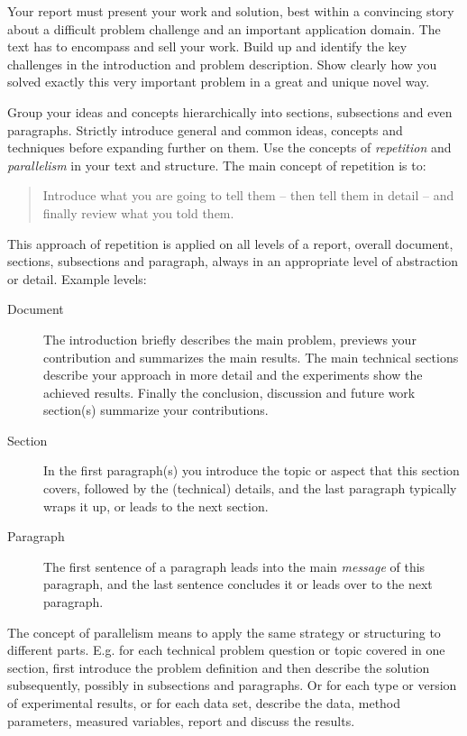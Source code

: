 \documentclass[11pt, a4paper,oneside,chapterprefix=false]{scrbook}
\begin{document}
Your report must present your work and solution, best within a convincing story about a difficult problem challenge and an important application domain. The text has to encompass and sell your work. Build up and identify the key challenges in the introduction and problem description. Show clearly how you solved exactly this very important problem in a great and unique novel way.

Group your ideas and concepts hierarchically into sections, subsections and even paragraphs. Strictly introduce general and common ideas, concepts and techniques before expanding further on them. Use the concepts of \emph{repetition} and \emph{parallelism} in your text and structure. The main concept of repetition is to:

\begin{quotation}
Introduce what you are going to tell them -- then tell them in detail -- and finally review what you told them.
\end{quotation}

This approach of repetition is applied on all levels of a report, overall document, sections, subsections and paragraph, always in an appropriate level of abstraction or detail. Example levels:

\begin{description}
\item[Document] The introduction briefly describes the main problem, previews your contribution and summarizes the main results. The main technical sections describe your approach in more detail and the experiments show the achieved results. Finally the conclusion, discussion and future work section(s) summarize your contributions.
\item[Section] In the first paragraph(s) you introduce the topic or aspect that this section covers, followed by the (technical) details, and the last paragraph typically wraps it up, or leads to the next section.
\item[Paragraph] The first sentence of a paragraph leads into the main \emph{message} of this paragraph, and the last sentence concludes it or leads over to the next paragraph.
\end{description}

The concept of parallelism means to apply the same strategy or structuring to different parts. E.g. for each technical problem question or topic covered in one section, first introduce the problem definition and then describe the solution subsequently, possibly in subsections and paragraphs. Or for each type or version of experimental results, or for each data set, describe the data, method parameters, measured variables, report and discuss the results.
\end{document}

